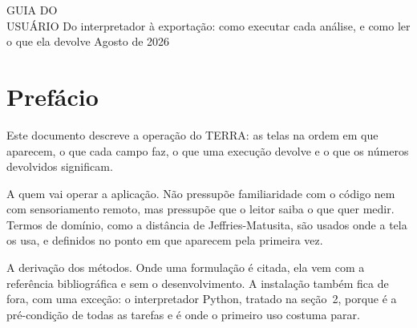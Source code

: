 \documentclass[12pt,a4paper]{article}
\begin{document}
\terracapaperiodico
  {GUIA DO\\USU\'ARIO}
  {Do interpretador \`a exporta\c{c}\~ao: como executar cada an\'alise, e
   como ler o que ela devolve}
  {Agosto de 2026}

%
%
\tableofcontents
\newpage

%
%
\section*{Pref\'acio}

Este documento descreve a opera\c{c}\~ao do TERRA: as telas na ordem em que
aparecem, o que cada campo faz, o que uma execu\c{c}\~ao devolve e o que os
n\'umeros devolvidos significam.

 A quem vai operar a aplica\c{c}\~ao. N\~ao pressup\~oe
familiaridade com o c\'odigo nem com sensoriamento remoto, mas pressup\~oe que
o leitor saiba o que quer medir. Termos de dom\'inio, como a dist\^ancia de
Jeffries-Matusita, s\~ao usados onde a tela os usa, e definidos no ponto em que
aparecem pela primeira vez.

 A deriva\c{c}\~ao dos m\'etodos. Onde uma
formula\c{c}\~ao \'e citada, ela vem com a refer\^encia bibliogr\'afica e sem
o desenvolvimento. A instala\c{c}\~ao tamb\'em fica de fora, com uma
exce\c{c}\~ao: o interpretador Python, tratado na se\c{c}\~ao~2, porque \'e a
pr\'e-condi\c{c}\~ao de todas as tarefas e \'e onde o primeiro uso costuma
parar.
\end{document}
